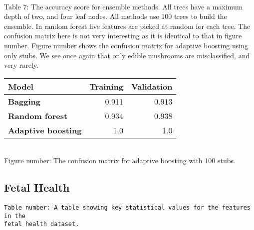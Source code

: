 \documentclass[11pt]{article}
\begin{document}
{ \hspace*{\fill} \\}
Table 7: The accuracy score for ensemble methods. All trees have a maximum depth of two, and four leaf nodes. All methods use 100 trees to build the ensemble. In random forest five features are picked at random for each tree. The confusion matrix here is not very interesting as it is identical to that in figure number. Figure number shows the confusion matrix for adaptive boosting using only stubs. We see once again that only edible mushrooms are misclassified, and very rarely.
\begin{table}[h!]
	\begin{center}
		\label{tab:table1}
		\begin{tabular}{l|r|r}
			\textbf{Model}                                                 	& \textbf{Training} & \textbf{Validation}
			\\ \hline
			\textbf{Bagging}                             		             & 0.911        & 0.913              \\ \hline
			\textbf{Random forest}                                		     & 0.934        & 0.938              \\ \hline
			\textbf{Adaptive boosting}   							    	 & 1.0          & 1.0                \\ \hline
		\end{tabular}
	\end{center}
\end{table}

\begin{center}
\end{center}
{ \hspace*{\fill} \\}
Figure number: The confusion matrix for adaptive boosting with 100 stubs.

    \hypertarget{fetal-health}{%
\subsection{Fetal Health}\label{fetal-health}}


    \begin{Verbatim}[commandchars=\\\{\}]
Table number: A table showing key statistical values for the features in the
fetal health dataset.
    \end{Verbatim}
\end{document}
